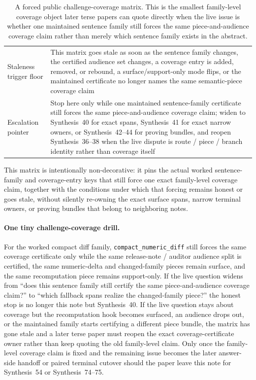 \documentclass[11pt]{article}
\begin{document}
\begin{table}[t]
\begin{tabularx}{\linewidth}{@{}lX@{}}
Staleness trigger floor & This matrix goes stale as soon as the sentence family changes, the certified audience set changes, a coverage entry is added, removed, or rebound, a \textsf{surface}/\textsf{support-only} mode flips, or the maintained certificate no longer names the same semantic-piece coverage claim \\
Escalation pointer & Stop here only while one maintained sentence-family certificate still forces the same piece-and-audience coverage claim; widen to Synthesis~40 for exact spans, Synthesis~41 for exact narrow owners, or Synthesis~42--44 for proving bundles, and reopen Synthesis~36--38 when the live dispute is route / piece / branch identity rather than coverage itself \\
\bottomrule
\end{tabularx}
\caption{A forced public challenge-coverage matrix. This is the smallest family-level coverage object later terse papers can quote directly when the live issue is whether one maintained sentence family still forces the same piece-and-audience coverage claim rather than merely which sentence family exists in the abstract.}
\label{tab:forced-public-challenge-coverage-matrix}
\end{table}

This matrix is intentionally non-decorative: it pins the actual worked sentence-family and coverage-entry keys that still force one exact family-level coverage claim, together with the conditions under which that forcing remains honest or goes stale, without silently re-owning the exact surface spans, narrow terminal owners, or proving bundles that belong to neighboring notes.\cite{series:workedexample}

\paragraph{One tiny challenge-coverage drill.}
For the worked compact diff family, \nolinkurl{compact_numeric_diff} still forces the same coverage certificate only while the same release-note / auditor audience split is certified, the same numeric-delta and changed-family pieces remain \textsf{surface}, and the same recomputation piece remains \textsf{support-only}. If the live question widens from ``does this sentence family still certify the same piece-and-audience coverage claim?'' to ``which fallback spans realize the changed-family piece?'' the honest stop is no longer this note but Synthesis~40. If the live question stays about coverage but the recomputation hook becomes surfaced, an audience drops out, or the maintained family starts certifying a different piece bundle, the matrix has gone stale and a later terse paper must reopen the exact coverage-certificate owner rather than keep quoting the old family-level claim. Only once the family-level coverage claim is fixed and the remaining issue becomes the later answer-side handoff or paired terminal cutover should the paper leave this note for Synthesis~54 or Synthesis~74--75.\cite{series:workedexample}
\end{document}
